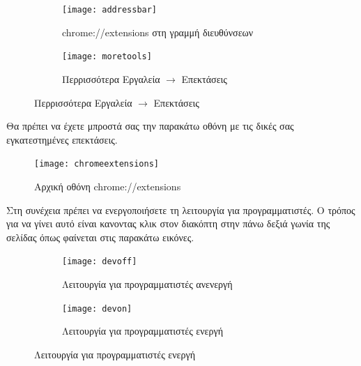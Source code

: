 \documentclass{article}
\begin{document}
\begin{figure}[ht]
    \centering
    \begin{minipage}[t]{0.45\textwidth}
        \centering
        \begin{subfigure}[t]{\textwidth}
            \texttt{[image: addressbar]}
            \caption{chrome://extensions στη γραμμή διευθύνσεων}
            \label{Fig:addressbar}
        \end{subfigure}
        \vspace{\fill}
    \end{minipage}
    \hfill
    \begin{minipage}{0.45\textwidth}
        \begin{subfigure}{\textwidth}
            \texttt{[image: moretools]}
            \caption{Περρισσότερα Εργαλεία $\rightarrow$ Επεκτάσεις}
            \label{Fig:moretools}
        \end{subfigure}
    \end{minipage}
\end{figure}

Θα πρέπει να έχετε μπροστά σας την παρακάτω οθόνη με τις δικές σας εγκατεστημένες επεκτάσεις.

\begin{figure}[H]
    \texttt{[image: chromeextensions]}
    \caption*{Αρχική οθόνη chrome://extensions}
\end{figure}

Στη συνέχεια πρέπει να ενεργοποιήσετε τη λειτουργία για προγραμματιστές. Ο τρόπος για να γίνει αυτό είναι κανοντας κλικ στον διακόπτη στην πάνω δεξιά γωνία της σελίδας όπως φαίνεται στις παρακάτω εικόνες.
\begin{figure}[H]
    \centering
    \begin{subfigure}{0.45\textwidth}
        \texttt{[image: devoff]}
        \caption{Λειτουργία για προγραμματιστές ανενεργή}
        \label{Fig:devoff}
    \end{subfigure}
    \hfill
    \begin{subfigure}{0.45\textwidth}
        \texttt{[image: devon]}
        \caption{Λειτουργία για προγραμματιστές ενεργή}
        \label{Fig:devon}
    \end{subfigure}
\end{figure}
\end{document}
